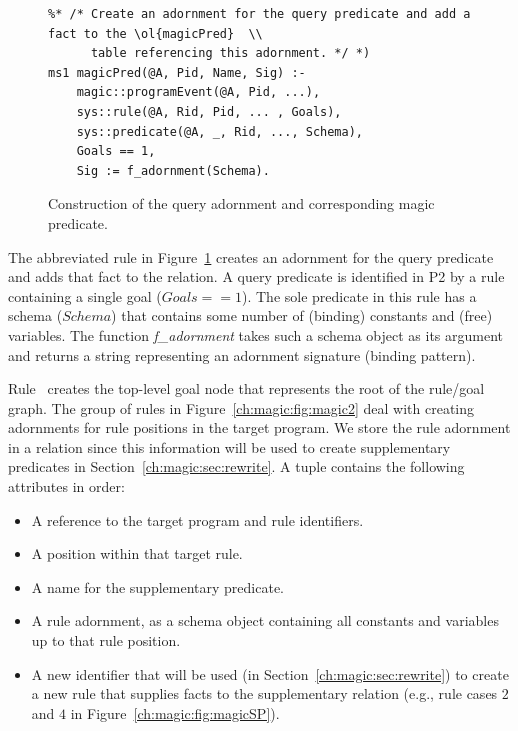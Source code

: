 \begin{figure}[!t]
\ssp
\centering
\begin{lstlisting}
%* /* Create an adornment for the query predicate and add a fact to the \ol{magicPred}  \\
      table referencing this adornment. */ *)
ms1 magicPred(@A, Pid, Name, Sig) :-
    magic::programEvent(@A, Pid, ...),
    sys::rule(@A, Rid, Pid, ... , Goals),
    sys::predicate(@A, _, Rid, ..., Schema),
    Goals == 1,
    Sig := f_adornment(Schema).
\end{lstlisting}
\caption{\label{ch:magic:fig:magic1}Construction of the query adornment and corresponding magic predicate.}
\end{figure}

The abbreviated rule in Figure~\ref{ch:magic:fig:magic1} creates an adornment
for the query predicate and adds that fact to the  relation.  A
query predicate is identified in P2 by a rule containing a single goal ($Goals
== 1$).  The sole predicate in this rule has a schema ($Schema$) that contains
some number of (binding) constants and (free) variables.  The function {\em
f\_adornment} takes such a schema object as its argument and returns a string
representing an adornment signature (binding pattern).

Rule~ creates the top-level goal node that represents the root of the
rule/goal graph.  The group of rules in Figure~\ref{ch:magic:fig:magic2} deal
with creating adornments for rule positions in the target program.  We store
the rule adornment in a  relation since this information will be used
to create supplementary predicates in Section~\ref{ch:magic:sec:rewrite}.  A
 tuple contains the following attributes in order:
\begin{itemize}
   \ssp
  \item A reference to the target program and rule identifiers. 
  \item A position within that target rule.
  \item A name for the supplementary predicate.
  \item A rule adornment, as a schema object containing all constants and variables up to that rule position.
  \item A new identifier that will be used (in Section~\ref{ch:magic:sec:rewrite}) to create 
    a new rule that supplies facts to the supplementary relation (e.g., rule cases $2$ and $4$ 
    in Figure~\ref{ch:magic:fig:magicSP}).
\end{itemize}

